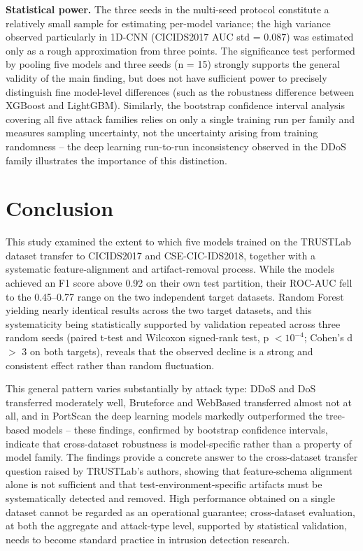 \documentclass[a4paper,fleqn]{cas-sc}
\begin{document}
\textbf{Statistical power.} The three seeds in the multi-seed protocol constitute a relatively small sample for estimating per-model variance; the high variance observed particularly in 1D-CNN (CICIDS2017 AUC std = 0.087) was estimated only as a rough approximation from three points. The significance test performed by pooling five models and three seeds (n = 15) strongly supports the general validity of the main finding, but does not have sufficient power to precisely distinguish fine model-level differences (such as the robustness difference between XGBoost and LightGBM). Similarly, the bootstrap confidence interval analysis covering all five attack families relies on only a single training run per family and measures sampling uncertainty, not the uncertainty arising from training randomness -- the deep learning run-to-run inconsistency observed in the DDoS family illustrates the importance of this distinction.

\FloatBarrier
\section{Conclusion}
\label{sec:conclusion}

This study examined the extent to which five models trained on the TRUSTLab dataset transfer to CICIDS2017 and CSE-CIC-IDS2018, together with a systematic feature-alignment and artifact-removal process. While the models achieved an F1 score above 0.92 on their own test partition, their ROC-AUC fell to the 0.45--0.77 range on the two independent target datasets. Random Forest yielding nearly identical results across the two target datasets, and this systematicity being statistically supported by validation repeated across three random seeds (paired t-test and Wilcoxon signed-rank test, p $< 10^{-4}$; Cohen's d $>$ 3 on both targets), reveals that the observed decline is a strong and consistent effect rather than random fluctuation.

This general pattern varies substantially by attack type: DDoS and DoS transferred moderately well, Bruteforce and WebBased transferred almost not at all, and in PortScan the deep learning models markedly outperformed the tree-based models -- these findings, confirmed by bootstrap confidence intervals, indicate that cross-dataset robustness is model-specific rather than a property of model family. The findings provide a concrete answer to the cross-dataset transfer question raised by TRUSTLab's authors, showing that feature-schema alignment alone is not sufficient and that test-environment-specific artifacts must be systematically detected and removed. High performance obtained on a single dataset cannot be regarded as an operational guarantee; cross-dataset evaluation, at both the aggregate and attack-type level, supported by statistical validation, needs to become standard practice in intrusion detection research.
\end{document}
